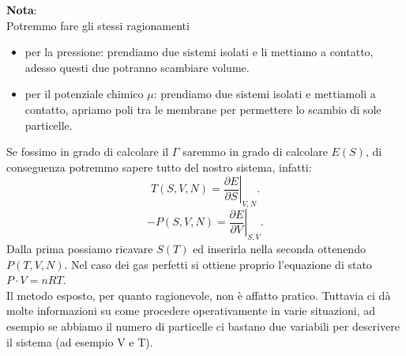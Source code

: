 \begin{framed}
\noindent \textbf{Nota}: \\
Potremmo fare gli stessi ragionamenti
\begin{itemize}
	\item per la pressione: prendiamo due sistemi isolati e li mettiamo a contatto, adesso questi due potranno scambiare volume.
	\item per il potenziale chimico $\mu$: prendiamo due sistemi isolati e mettiamoli a contatto, apriamo poli tra le membrane per permettere lo scambio di sole particelle.
\end{itemize}
\end{framed}
\noindent 
Se fossimo in grado di calcolare il $\Gamma$ saremmo in grado di calcolare $E\left( S \right)$, di conseguenza potremmo sapere tutto del nostro sistema, infatti:
\[
	T\left( S,V,N \right)  = \left.\frac{\partial E}{\partial S} \right|_{V,N}
.\] 
\[
	- P \left( S,V,N \right) = \left.\frac{\partial E}{\partial V} \right|_{S,V}
.\] 
Dalla prima possiamo ricavare $S\left( T \right)$ ed inserirla nella seconda ottenendo $P\left( T,V,N \right)$. Nel caso dei gas perfetti si ottiene proprio l'equazione di stato $P\cdot V = nRT$.\\
Il metodo esposto, per quanto ragionevole, non è affatto pratico. Tuttavia ci dà molte informazioni su come procedere operativamente in varie situazioni, ad esempio se abbiamo il numero di particelle ci bastano due variabili per descrivere il sistema (ad esempio V e T).\\ 
